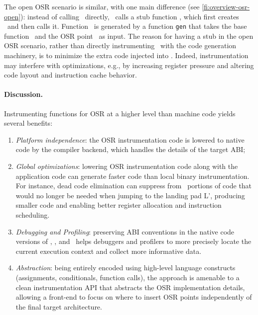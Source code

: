 The open OSR scenario is similar, with one main difference (see \myfigure\ref{fi:overview-osr-open}): instead of calling \fosrto\ directly, \fosrfrom\ calls a stub function \fstub, which first creates \fosrto\ and then calls it. Function \fosrto\ is generated by a function {\tt gen} that takes the base function \fbase\ and the OSR point \osrpoint\ as input. The reason for having a stub in the open OSR scenario, rather than directly instrumenting \fbase\ with the code generation machinery, is to minimize the extra code injected into \fbase. Indeed, instrumentation may interfere with optimizations, e.g., by increasing register pressure and altering code layout and instruction cache behavior.


\paragraph{Discussion.}
Instrumenting functions for OSR at a higher level than machine code yields several benefits: 
\begin{enumerate}
\item {\em Platform independence}: the OSR instrumentation code is lowered to native code by the compiler backend, which handles the details of the target ABI; 
\item {\em Global optimizations}: lowering OSR instrumentation code along with the application code can generate faster code than local binary instrumentation. For instance, dead code elimination can suppress from \fosrto\ portions of code that would no longer be needed when jumping to the landing pad \textsf{L'}, producing smaller code and enabling better register allocation and instruction scheduling.
\item {\em Debugging and Profiling}: preserving ABI conventions in the native code versions of \fosrfrom, \fstub, and \fosrto\ helps debuggers and profilers to more precisely locate the current execution context and collect more informative data.
\item {\em Abstraction}: being entirely encoded using high-level language constructs (assignments, conditionals, function calls), the approach is amenable to a clean instrumentation API that abstracts the OSR implementation details, allowing a front-end to focus on where to insert OSR points independently of the final target architecture.
\end{enumerate}

